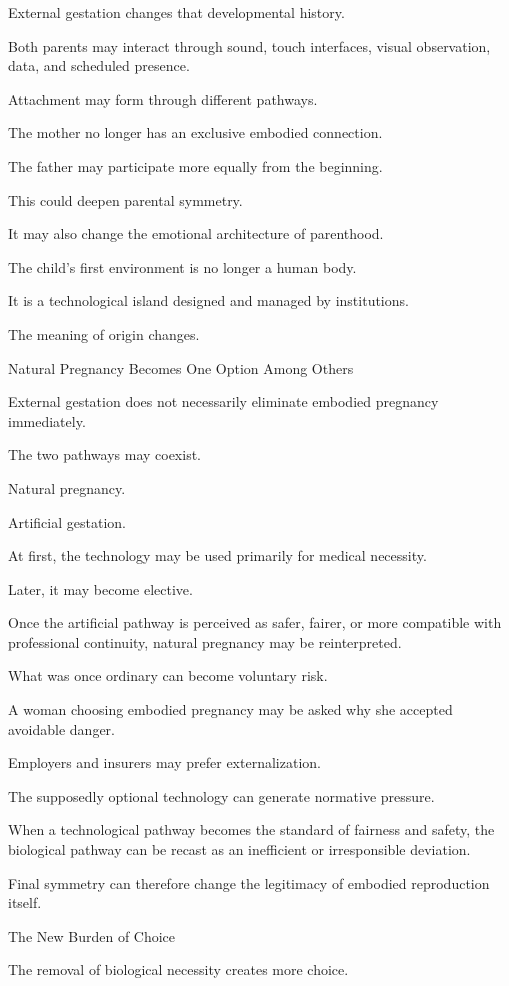 External gestation changes that developmental history.

Both parents may interact through sound, touch interfaces, visual observation, data, and scheduled presence.

Attachment may form through different pathways.

The mother no longer has an exclusive embodied connection.

The father may participate more equally from the beginning.

This could deepen parental symmetry.

It may also change the emotional architecture of parenthood.

The child’s first environment is no longer a human body.

It is a technological island designed and managed by institutions.

The meaning of origin changes.

Natural Pregnancy Becomes One Option Among Others

External gestation does not necessarily eliminate embodied pregnancy immediately.

The two pathways may coexist.

Natural pregnancy.

Artificial gestation.

At first, the technology may be used primarily for medical necessity.

Later, it may become elective.

Once the artificial pathway is perceived as safer, fairer, or more compatible with professional continuity, natural pregnancy may be reinterpreted.

What was once ordinary can become voluntary risk.

A woman choosing embodied pregnancy may be asked why she accepted avoidable danger.

Employers and insurers may prefer externalization.

The supposedly optional technology can generate normative pressure.

When a technological pathway becomes the standard of fairness and safety, the biological pathway can be recast as an inefficient or irresponsible deviation.

Final symmetry can therefore change the legitimacy of embodied reproduction itself.

The New Burden of Choice

The removal of biological necessity creates more choice.

